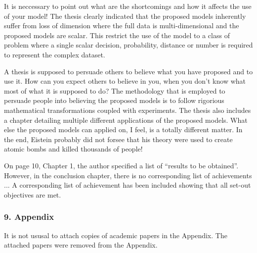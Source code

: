 \replyToComment
    {
      It is neccessary to point out what are the shortcomings and how it affects the use of your model!
    }
    {
      The thesis clearly indicated that the proposed models inherently suffer from loss of dimension where the full data is multi-dimensional and the proposed models are scalar.
      This restrict the use of the model to a class of problem where a single scalar decision, probability, distance or number is required to represent the complex dataset.
    }

\replyToComment
    {
      A thesis is supposed to persuade others to believe what you have proposed and to use it.
      How can you expect others to believe in you, when you don't know what most of what it is supposed to do?
    }
    {
      The methodology that is employed to persuade people into believing the proposed models is to follow rigorious mathematical transformations coupled with experiments.
      The thesis also includes a chapter detailing multiple different applications of the proposed models.
      What else the proposed models can applied on, I feel, is a totally different matter.
      In the end, Eistein probably did not forsee that his theory were used to create atomic bombs and killed thousands of people!
    }

\replyToComment
    {
      On page 10, Chapter 1, the author specified a list of ``results to be obtained''.
      However, in the conclusion chapter, there is no corresponding list of achievements ...
    }
    {
      A corresponding list of achievement has been included showing that all set-out objectives are met.
    }
    
%

\subsubsection*{9. Appendix}

\replyToComment
    {It is not ususal to attach copies of academic papers in the Appendix.}
    {The attached papers were removed from the Appendix.}




